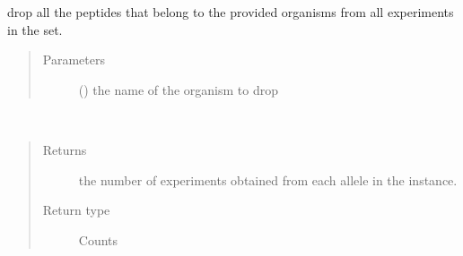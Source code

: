 \documentclass[letterpaper,10pt,english]{sphinxmanual}
\begin{document}
\begin{fulllineitems}
\begin{fulllineitems}
\end{fulllineitems}


\begin{fulllineitems}
\label{\detokenize{IPTK.Classes:IPTK.Classes.ExperimentalSet.ExperimentSet.drop_peptides_belong_to_org}}
drop all the peptides that belong to the provided organisms from all experiments in the set.
\begin{quote}\begin{description}
\item[{Parameters}] \leavevmode
{} () \textendash{} the name of the organism to drop

\end{description}\end{quote}

\end{fulllineitems}


\begin{fulllineitems}
\label{\detokenize{IPTK.Classes:IPTK.Classes.ExperimentalSet.ExperimentSet.get_allele_count}}~\begin{quote}\begin{description}
\item[{Returns}] \leavevmode
the number of experiments obtained from each allele in the instance.

\item[{Return type}] \leavevmode
Counts

\end{description}\end{quote}

\end{fulllineitems}


\end{fulllineitems}
\end{document}
